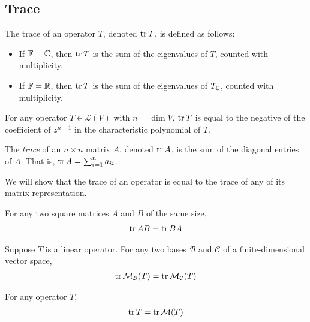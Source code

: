 \documentclass{article}
\begin{document}
\subsection{Trace}

\begin{definition}
  The trace of an operator $T$, denoted $\tr T$, is defined as follows:
  \begin{itemize}
    \item If $\mathbb{F} = \mathbb{C}$, then $\tr T$ is the sum of the eigenvalues of $T$, counted with multiplicity.
    \item If $\mathbb{F} = \mathbb{R}$, then $\tr T$ is the sum of the eigenvalues of $T_{\mathbb{C}}$, counted with multiplicity.
  \end{itemize}
\end{definition}

\begin{theorem}
  For any operator $T \in \mathcal{L}(V)$ with $n = \dim V$, $\tr T$ is equal to the negative of the coefficient of $z^{n - 1}$ in the characteristic polynomial of $T$.
\end{theorem}

\begin{definition}
  The \emph{trace} of an $n \times n$ matrix $A$, denoted $\trace A$, is the sum of the diagonal entries of $A$.
  That is, $\tr A = \sum_{i = 1}^n a_{ii}$.
\end{definition}

We will show that the trace of an operator is equal to the trace of any of its matrix representation.

\begin{lemma}
  For any two square matrices $A$ and $B$ of the same size,
  \begin{align}
    \tr AB = \tr BA
  \end{align}
\end{lemma}

\begin{lemma}
  Suppose $T$ is a linear operator.
  For any two bases $\mathcal{B}$ and $\mathcal{C}$ of a finite-dimensional vector space,
  \begin{align}
    \tr \mathcal{M}_\mathcal{B}(T) = \tr \mathcal{M}_\mathcal{C}(T)
  \end{align}
\end{lemma}

\begin{theorem}
  For any operator $T$,
  \begin{align}
    \trace T = \tr \mathcal{M}(T)
  \end{align}
\end{theorem}
\end{document}
